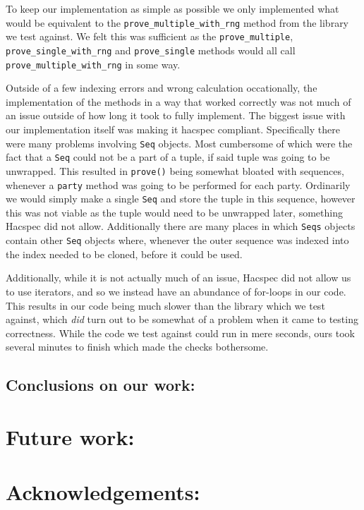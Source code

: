 \documentclass{article}
\begin{document}
To keep our implementation as simple as possible we only implemented what would be equivalent to the \texttt{prove\_multiple\_with\_rng} method from the library we test against. We felt this was sufficient as the \texttt{prove\_multiple}, \texttt{prove\_single\_with\_rng} and \texttt{prove\_single} methods would all call \texttt{prove\_multiple\_with\_rng} in some way.

Outside of a few indexing errors and wrong calculation occationally, the implementation of the methods in a way that worked correctly was not much of an issue outside of how long it took to fully implement. The biggest issue with our implementation itself was making it hacspec compliant. Specifically there were many problems involving \texttt{Seq} objects. Most cumbersome of which were the fact that a \texttt{Seq} could not be a part of a tuple, if said tuple was going to be unwrapped. This resulted in \texttt{prove()} being somewhat bloated with sequences, whenever a \texttt{party} method was going to be performed for each party. Ordinarily we would simply make a single \texttt{Seq} and store the tuple in this sequence, however this was not viable as the tuple would need to be unwrapped later, something Hacspec did not allow. Additionally there are many places in which \texttt{Seqs} objects contain other \texttt{Seq} objects where, whenever the outer sequence was indexed into the index needed to be cloned, before it could be used. 

Additionally, while it is not actually much of an issue, Hacspec did not allow us to use iterators, and so we instead have an abundance of for-loops in our code. This results in our code being much slower than the library which we test against, which \textit{did} turn out to be somewhat of a problem when it came to testing correctness. While the code we test against could run in mere seconds, ours took several minutes to finish which made the checks bothersome. 

\subsection{Conclusions on our work:}

\section{Future work:}

\section{Acknowledgements:}
\end{document}
